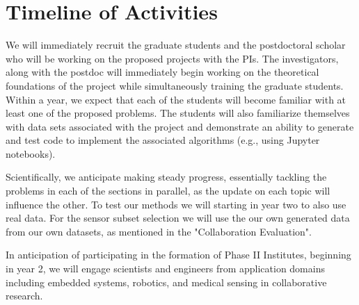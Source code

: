 \section{Timeline of Activities}
We will immediately recruit the graduate students and the postdoctoral scholar who will be working on the proposed projects with the PIs. The investigators, along with the postdoc will immediately begin working on the theoretical foundations of the project while simultaneously training the graduate students. Within a year, we expect that each of the students will become familiar with at least one of the proposed problems. The students will also familiarize themselves with data sets associated with the project and demonstrate an ability to generate and test code to implement the associated algorithms (e.g., using Jupyter notebooks). 

Scientifically, we anticipate making steady progress, essentially tackling the problems in each of the sections in parallel, as the update on each topic will influence the other. To test our methods we will starting in year two to also use real data. For the sensor subset selection we will use the our own generated data from our own datasets, as mentioned in the "Collaboration Evaluation". 

In anticipation of participating in the formation of Phase II Institutes, beginning in year 2, we will  engage scientists and engineers from application domains including embedded systems, robotics, and medical sensing in collaborative research. 